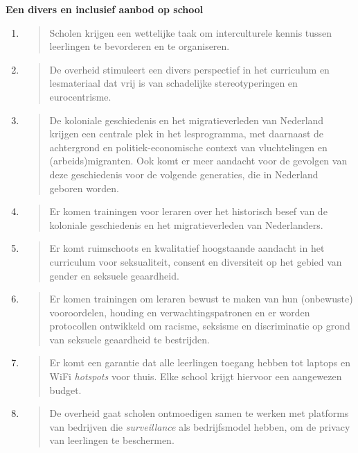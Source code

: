 \textbf{Een divers en inclusief aanbod op school}

\begin{enumerate}
\def\labelenumi{\arabic{enumi}.}
\item
  \begin{quote}
  Scholen krijgen een wettelijke taak om interculturele kennis tussen
  leerlingen te bevorderen en te organiseren.
  \end{quote}
\item
  \begin{quote}
  De overheid stimuleert een divers perspectief in het curriculum en
  lesmateriaal dat vrij is van schadelijke stereotyperingen en
  eurocentrisme.
  \end{quote}
\item
  \begin{quote}
  De koloniale geschiedenis en het migratieverleden van Nederland
  krijgen een centrale plek in het lesprogramma, met daarnaast de
  achtergrond en politiek-economische context van vluchtelingen en
  (arbeids)migranten. Ook komt er meer aandacht voor de gevolgen van
  deze geschiedenis voor de volgende generaties, die in Nederland
  geboren worden.
  \end{quote}
\item
  \begin{quote}
  Er komen trainingen voor leraren over het historisch besef van de
  koloniale geschiedenis en het migratieverleden van Nederlanders.
  \end{quote}
\item
  \begin{quote}
  Er komt ruimschoots en kwalitatief hoogstaande aandacht in het
  curriculum voor seksualiteit, consent en diversiteit op het gebied van
  gender en seksuele geaardheid.
  \end{quote}
\item
  \begin{quote}
  Er komen trainingen om leraren bewust te maken van hun (onbewuste)
  vooroordelen, houding en verwachtingspatronen en er worden protocollen
  ontwikkeld om racisme, seksisme en discriminatie op grond van seksuele
  geaardheid te bestrijden.
  \end{quote}
\item
  \begin{quote}
  Er komt een garantie dat alle leerlingen toegang hebben tot laptops en
  WiFi \emph{hotspots} voor thuis. Elke school krijgt hiervoor een
  aangewezen budget.
  \end{quote}
\item
  \begin{quote}
  De overheid gaat scholen ontmoedigen samen te werken met platforms van
  bedrijven die \emph{surveillance} als bedrijfsmodel hebben, om de
  privacy van leerlingen te beschermen.
  \end{quote}
\end{enumerate}

